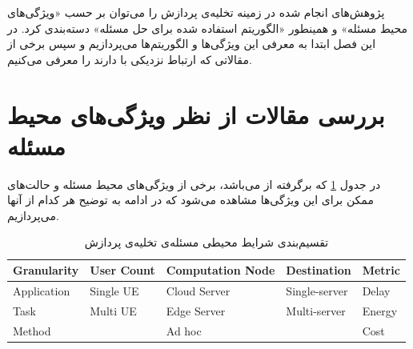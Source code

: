 پژوهش‌های انجام شده در زمینه تخلیه‌ی پردازش را می‌توان بر حسب «ویژگی‌های محیط مسئله» و همینطور «الگوریتم استفاده شده برای حل مسئله» دسته‌بندی کرد. در این فصل ابتدا به معرفی این ویژگی‌ها و الگوریتم‌ها می‌پردازیم و سپس برخی از مقالاتی که ارتباط نزدیکی با \CurrentProject دارند را معرفی می‌کنیم.

\section[ویژگی‌های محیط مسئله]{بررسی مقالات از نظر ویژگی‌های محیط مسئله} 
در جدول \ref{table:mohit} که برگرفته از \Cite{wang2019} می‌باشد، برخی از ویژگی‌های محیط مسئله و حالت‌های ممکن برای این ویژگی‌ها مشاهده می‌شود که در ادامه به توضیح هر کدام از آنها می‌پردازیم.
\begin{table}[H]
	\centering
	\begin{latin}

\begin{tabular}{@{}lllll@{}}
	\toprule
	\textbf{Granularity} & \textbf{User Count} & \textbf{Computation Node} & \textbf{Destination} & \textbf{Metric} \\ \midrule
	Application          & Single UE             & Cloud Server      & Single-server        & Delay           \\
	Task                 & Multi UE   & Edge Server       & Multi-server         & Energy          \\
	Method               &             & Ad hoc            &                      & Cost            \\ \bottomrule
\end{tabular}
	\end{latin}
	\caption{تقسیم‌بندی شرایط محیطی مسئله‌ی تخلیه‌ی پردازش}
	\label{table:mohit}
\end{table}

